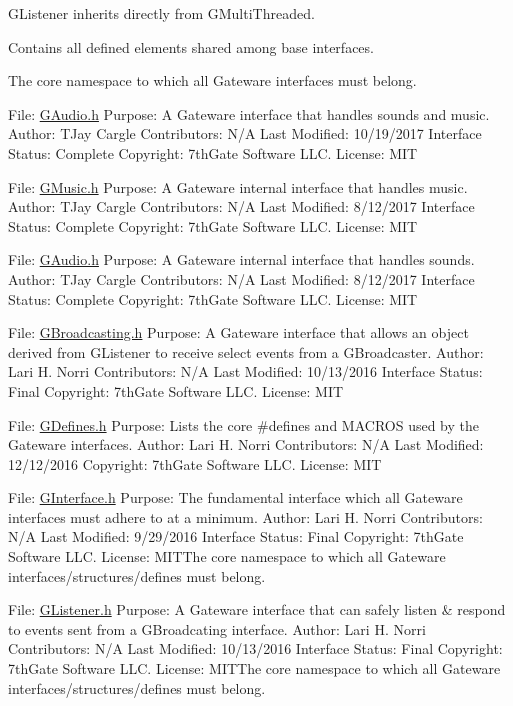 G\+Listener inherits directly from G\+Multi\+Threaded.

Contains all defined elements shared among base interfaces.

The core namespace to which all Gateware interfaces must belong.

File\+: \hyperlink{GAudio_8h_source}{G\+Audio.\+h} Purpose\+: A Gateware interface that handles sounds and music. Author\+: T\+Jay Cargle Contributors\+: N/A Last Modified\+: 10/19/2017 Interface Status\+: Complete Copyright\+: 7th\+Gate Software L\+LC. License\+: M\+IT

File\+: \hyperlink{GMusic_8h_source}{G\+Music.\+h} Purpose\+: A Gateware internal interface that handles music. Author\+: T\+Jay Cargle Contributors\+: N/A Last Modified\+: 8/12/2017 Interface Status\+: Complete Copyright\+: 7th\+Gate Software L\+LC. License\+: M\+IT

File\+: \hyperlink{GAudio_8h_source}{G\+Audio.\+h} Purpose\+: A Gateware internal interface that handles sounds. Author\+: T\+Jay Cargle Contributors\+: N/A Last Modified\+: 8/12/2017 Interface Status\+: Complete Copyright\+: 7th\+Gate Software L\+LC. License\+: M\+IT

File\+: \hyperlink{GBroadcasting_8h_source}{G\+Broadcasting.\+h} Purpose\+: A Gateware interface that allows an object derived from G\+Listener to receive select events from a G\+Broadcaster. Author\+: Lari H. Norri Contributors\+: N/A Last Modified\+: 10/13/2016 Interface Status\+: Final Copyright\+: 7th\+Gate Software L\+LC. License\+: M\+IT

File\+: \hyperlink{GDefines_8h_source}{G\+Defines.\+h} Purpose\+: Lists the core \#defines and M\+A\+C\+R\+OS used by the Gateware interfaces. Author\+: Lari H. Norri Contributors\+: N/A Last Modified\+: 12/12/2016 Copyright\+: 7th\+Gate Software L\+LC. License\+: M\+IT

File\+: \hyperlink{GInterface_8h_source}{G\+Interface.\+h} Purpose\+: The fundamental interface which all Gateware interfaces must adhere to at a minimum. Author\+: Lari H. Norri Contributors\+: N/A Last Modified\+: 9/29/2016 Interface Status\+: Final Copyright\+: 7th\+Gate Software L\+LC. License\+: M\+I\+T\+The core namespace to which all Gateware interfaces/structures/defines must belong.

File\+: \hyperlink{GListener_8h_source}{G\+Listener.\+h} Purpose\+: A Gateware interface that can safely listen \& respond to events sent from a G\+Broadcating interface. Author\+: Lari H. Norri Contributors\+: N/A Last Modified\+: 10/13/2016 Interface Status\+: Final Copyright\+: 7th\+Gate Software L\+LC. License\+: M\+I\+T\+The core namespace to which all Gateware interfaces/structures/defines must belong.

